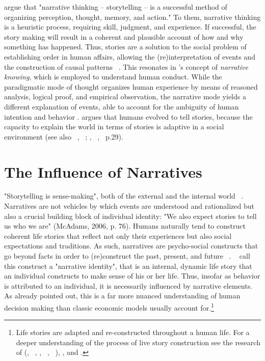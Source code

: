 \documentclass[11pt,a4paper,english,oneside]{book}
\numberwithin{equation}{chapter}
\begin{document}
\citet[pp.~123--124]{RobinsonJohnA.HawpeLinda.1986} argue that "narrative thinking -- storytelling -- is a successful method of organizing perception, thought, memory, and action." To them, narrative thinking is a heuristic process, requiring skill, judgment, and experience. If successful, the story making will result in a coherent and plausible account of how and why something has happened. Thus, stories are a solution to the social problem of establishing order in human affairs, allowing the (re)interpretation of events and the construction of causal patterns ~\cite[pp.~111--112]{RobinsonJohnA.HawpeLinda.1986}. This resonates in \citeauthor{Bruner.2000}'s \citeyearpar{Bruner.2000} concept of \textit{narrative knowing}, which is employed to understand human conduct. While the paradigmatic mode of thought  organizes human experience by means of reasoned analysis, logical proof, and empirical observation, the narrative mode yields a different explanation of events, able to account for the ambiguity of human intention and behavior \citep{Bruner.2000}. \citeauthor{Bruner.2000} argues that humans evolved to tell stories, because the capacity to explain the world in terms of stories is adaptive in a social environment (see also ~\citeauthor{McAdams.2006}, ~\citeyear{McAdams.2006}; \citeauthor{McAdams.1993}, ~\citeyear{McAdams.1993}, ~p.29).


\section{The Influence of Narratives}\label{CH:2.2} 

"Storytelling is sense-making", both of the external and the internal world ~\citep[p. 76]{McAdams.2006}. Narratives are not vehicles by which events are understood and rationalized but also a crucial building block of individual identity: "We also expect stories to tell us who
we are" (McAdams, 2006, p. 76). Humans naturally tend to construct coherent life stories that reflect not only their experiences but also social expectations and traditions.  As such, narratives are psycho-social constructs that go beyond facts in order to (re)construct the past, present, and future ~\cite[pp.~301--307]{McAdams.1996}. ~\citet[p.~81]{JackJ.Bauer.2008} call this construct a "narrative identity", that is an internal, dynamic life story that an individual constructs to make sense of his or her life. Thus, insofar as behavior is attributed to an individual, it is necessarily influenced by narrative elements. As \citet[p. 59]{Akerlof.2016} already pointed out, this is a far more nuanced understanding of human decision making than classic economic models usually account for.\footnote{Life stories are adapted and re-constructed throughout a human life. For a deeper understanding of the process of live story construction see the research of \citeauthor{McAdams.1985} (\citeyear{McAdams.1985}, ~\citeyear{McAdams.1996}, \citeyear{McAdams.2001}, ~\citeyear{McAdams.2006}, ~\citeyear{McAdams.}), \cite{Damasio.1999}, and \cite{Habermas.2000}.}
\end{document}
